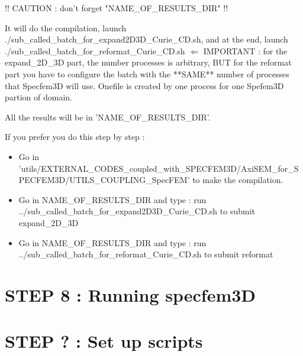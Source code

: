 \documentclass[11pt]{article}
\begin{document}
\medskip

\noindent !! CAUTION : don't forget "NAME\_OF\_RESULTS\_DIR" !!

\medskip

\noindent It will do the compilation, launch ./sub\_called\_batch\_for\_expand2D3D\_Curie\_CD.sh, and at the end, launch ./sub\_called\_batch\_for\_reformat\_Curie\_CD.sh $\Longleftarrow$ IMPORTANT : for the expand\_2D\_3D part, the number processes is arbitrary, BUT for the reformat part you have to configure the batch with the **SAME** number of processes that Specfem3D will use. Onefile is created by one process for one Spefem3D partion of domain.

\smallskip

\noindent All the results will be in 'NAME\_OF\_RESULTS\_DIR'. 

\bigskip

\noindent If you prefer you do this step by step : 

\begin{itemize}

\item[\textbullet] Go in {\scriptsize 'utils/EXTERNAL\_CODES\_coupled\_with\_SPECFEM3D/AxiSEM\_for\_SPECFEM3D/UTILS\_COUPLING\_SpecFEM'} to make the compilation.
\item[\textbullet] Go in NAME\_OF\_RESULTS\_DIR and type : run ../sub\_called\_batch\_for\_expand2D3D\_Curie\_CD.sh to submit expand\_2D\_3D
\item[\textbullet] Go in NAME\_OF\_RESULTS\_DIR and type : run ../sub\_called\_batch\_for\_reformat\_Curie\_CD.sh to submit reformat

\end{itemize}

\section{STEP 8 : Running specfem3D}


\section{STEP ? : Set up scripts}
\end{document}
